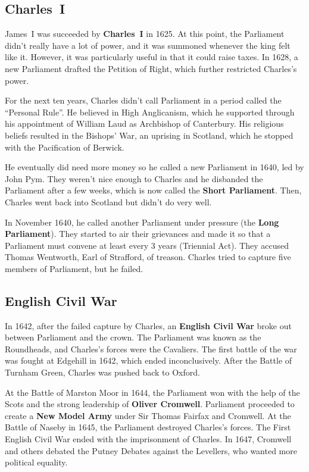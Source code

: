 \subsection*{Charles~I}

James~I was succeeded by \textbf{Charles~I} in 1625.
At this point, the Parliament didn't really have a lot of power,
and it was summoned whenever the king felt like it.
However, it was particularly useful in that it could raise taxes.
In 1628, a new Parliament drafted the Petition of Right, which further restricted Charles's power.

For the next ten years, Charles didn't call Parliament in a period called the ``Personal Rule''.
He believed in High Anglicanism,
which he supported through his appointment of William Laud as Archbishop of Canterbury.
His religious beliefs resulted in the Bishops' War, an uprising in Scotland,
which he stopped with the Pacification of Berwick.

He eventually did need more money so he called a new Parliament in 1640, led by John Pym.
They weren't nice enough to Charles and he disbanded the Parliament after a few weeks,
which is now called the \textbf{Short Parliament}.
Then, Charles went back into Scotland but didn't do very well.

In November 1640, he called another Parliament under pressure (the \textbf{Long Parliament}).
They started to air their grievances
and made it so that a Parliament must convene at least every 3 years (Triennial Act).
They accused Thomas Wentworth, Earl of Strafford, of treason.
Charles tried to capture five members of Parliament, but he failed.

\subsection*{English Civil War}

In 1642, after the failed capture by Charles,
an \textbf{English Civil War} broke out between Parliament and the crown.
The Parliament was known as the Roundheads, and Charles's forces were the Cavaliers.
The first battle of the war was fought at Edgehill in 1642, which ended inconclusively.
After the Battle of Turnham Green, Charles was pushed back to Oxford.

At the Battle of Marston Moor in 1644, the Parliament won with the help of the Scots
and the strong leadership of \textbf{Oliver Cromwell}.
Parliament proceeded to create a \textbf{New Model Army} under Sir Thomas Fairfax and Cromwell.
At the Battle of Naseby in 1645, the Parliament destroyed Charles's forces.
The First English Civil War ended with the imprisonment of Charles.
In 1647, Cromwell and others debated the Putney Debates against the Levellers,
who wanted more political equality.


